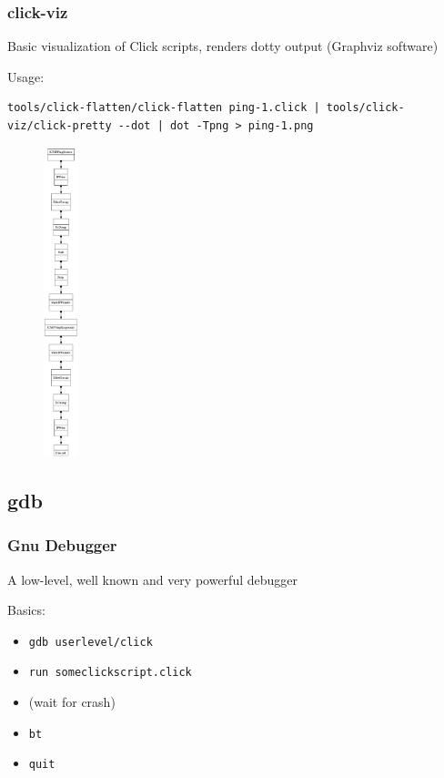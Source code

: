 \documentclass{beamer}
\begin{document}
\begin{frame}[fragile]
\frametitle{click-viz}
\begin{minipage}[t]{0.7\linewidth}

Basic visualization of Click scripts, renders dotty output (Graphviz software)

Usage:
\begin{lstlisting}
tools/click-flatten/click-flatten ping-1.click | tools/click-viz/click-pretty --dot | dot -Tpng > ping-1.png
\end{lstlisting}

\end{minipage}
\begin{minipage}[t]{0.15\linewidth}
\begin{figure}[t]
	\centering
	\includegraphics[width=1cm]{figures/clickvizcropped.pdf}
\end{figure}
\end{minipage}

\end{frame}

\subsection{gdb} %
\label{sub:gdb}

\begin{frame}
\frametitle{Gnu Debugger}
A low-level, well known and very powerful debugger

Basics:
\begin{itemize}
	\item \lstinline!gdb userlevel/click!
	\item \lstinline!run someclickscript.click!
	\item (wait for crash)
	\item \lstinline!bt!
	\item \lstinline!quit!
\end{itemize}
\end{frame}
\end{document}
